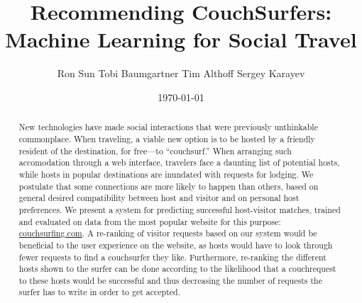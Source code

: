\documentclass{article}
\title{Recommending CouchSurfers: Machine Learning for Social Travel}
\author{Ron Sun \And Tobi Baumgartner \And Tim Althoff \And Sergey Karayev}
\date{\today}
\begin{document}
\maketitle

\begin{abstract}
New technologies have made social interactions that were previously unthinkable commonplace.
When traveling, a viable new option is to be hosted by a friendly resident of the destination, for free---to ``couchsurf.''
When arranging such accomodation through a web interface, travelers face a daunting list of potential hosts, while hosts in popular destinations are inundated with requests for lodging.
We postulate that some connections are more likely to happen than others, based on general desired compatibility between host and visitor and on personal host preferences.
We present a system for predicting successful host-visitor matches, trained and evaluated on data from the most popular website for this purpose: \url{couchsurfing.com}.
A re-ranking of visitor requests based on our system would be beneficial to the user experience on the website, as hosts would have to look through fewer requests to find a couchsurfer they like.
Furthermore, re-ranking the different hosts shown to the surfer can be done according to the likelihood that a couchrequest to these hosts would be successful and thus decreasing the number of requests the surfer has to write in order to get accepted.
\end{abstract}











\small

\end{document}
